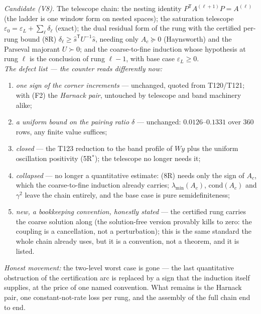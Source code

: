 \documentclass[11pt,a4paper]{article}
\begin{document}
\begin{keybox}
\emph{Candidate (V8).} The telescope chain: the nesting identity
$P^{\mathsf T}A^{(\ell+1)}P=A^{(\ell)}$ (the ladder is one window form on nested spaces);
the saturation telescope $\varepsilon_0=\varepsilon_L+\sum_\ell\delta_\ell$ (exact); the
dual residual form of the rung with the certified per-rung bound (8R)
$\delta_\ell\ge\hat s^{\mathsf T}U^{-1}\hat s$, needing only $A_c\succeq0$ (Haynsworth) and
the Parseval majorant $U\succ0$; and the coarse-to-fine induction whose hypothesis at rung
$\ell$ is the conclusion of rung $\ell-1$, with base case $\varepsilon_L\ge0$.\\[3pt]
\emph{The defect list --- the counter reads differently now:}
\begin{enumerate}[leftmargin=1.6em]
\item[\textbf{(F1)}] \emph{one sign of the corner increments} --- unchanged, quoted from
T120/T121; with (F2) the \emph{Harnack pair}, untouched by telescope and band machinery
alike;
\item[\textbf{(F2)}] \emph{a uniform bound on the pairing ratio $\delta$} --- unchanged:
$0.0126$--$0.1331$ over $360$ rows, any finite value suffices;
\item[\textbf{(F3)}] \emph{closed} --- the T123 reduction to the band profile of $Wy$ plus
the uniform oscillation positivity (5R$^*$); the telescope no longer needs it;
\item[\textbf{(F4)}] \emph{collapsed} --- no longer a quantitative estimate: (8R) needs
only the sign of $A_c$, which the coarse-to-fine induction already carries;
$\lambda_{\min}(A_c)$, $\mathrm{cond}(A_c)$ and $\gamma^2$ leave the chain entirely, and
the base case is pure semidefiniteness;
\item[\textbf{(F5)}] \emph{new, a bookkeeping convention, honestly stated} --- the
certified rung carries the coarse solution along (the solution-free version provably kills
to zero: the coupling is a cancellation, not a perturbation); this is the same standard the
whole chain already uses, but it is a convention, not a theorem, and it is listed.
\end{enumerate}
\emph{Honest movement:} the two-level worst case is gone --- the last quantitative
obstruction of the certification arc is replaced by a sign that the induction itself
supplies, at the price of one named convention. What remains is the Harnack pair, one
constant-not-rate loss per rung, and the assembly of the full chain end to end.
\end{keybox}
\end{document}
